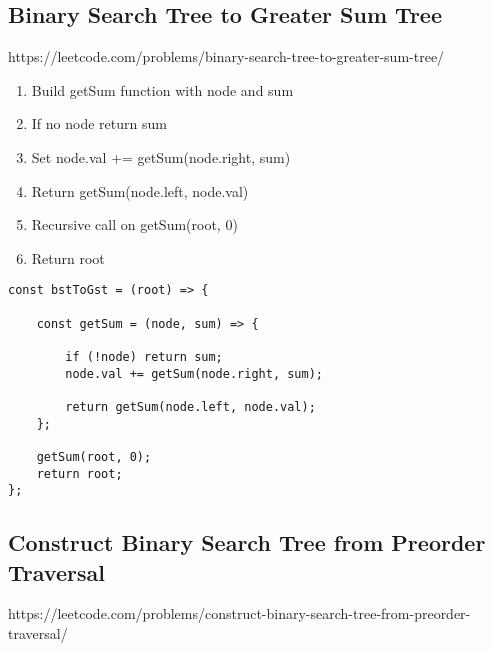 \documentclass[10pt]{article}
\begin{document}
\pagebreak
\medskip   
\subsection {Binary Search Tree to Greater Sum Tree}
https://leetcode.com/problems/binary-search-tree-to-greater-sum-tree/

\begin{enumerate}
	\item Build getSum function with node and sum
	\item If no node return sum
	\item Set node.val += getSum(node.right, sum)
	\item Return getSum(node.left, node.val)
	\item Recursive call on getSum(root, 0)
	\item Return root
\end{enumerate}

\begin{lstlisting}[title=Solution bstToGst, captionpos=t]
const bstToGst = (root) => {
    
    const getSum = (node, sum) => {
        
        if (!node) return sum;
        node.val += getSum(node.right, sum);
        
        return getSum(node.left, node.val);
    };
    
    getSum(root, 0);
    return root;
};
\end{lstlisting}

\medskip %

























\pagebreak
\medskip   
\subsection {Construct Binary Search Tree from Preorder Traversal}
https://leetcode.com/problems/construct-binary-search-tree-from-preorder-traversal/
\end{document}
